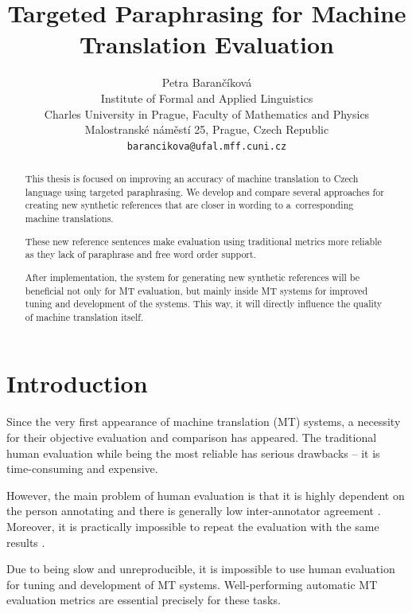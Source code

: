 \documentclass[11pt]{article}
\title{Targeted Paraphrasing for Machine Translation Evaluation}
\author{Petra Barančíková \\
  Institute of Formal and Applied Linguistics \\
  Charles University in Prague, Faculty of Mathematics and Physics\\
  Malostranské náměstí 25, Prague, Czech Republic \\
  {\tt barancikova@ufal.mff.cuni.cz} \\}
\date{}
\begin{document}
\maketitle
\begin{abstract}
This thesis is focused on improving an accuracy of machine translation to 
Czech language using targeted paraphrasing. We develop and compare several 
approaches for creating new synthetic references that are closer in wording to 
a~corresponding machine translations. 

These new reference sentences make evaluation using traditional metrics 
more reliable as they lack of paraphrase and free word order support.

After implementation, the system for generating new synthetic references will 
be beneficial not only for MT evaluation, but mainly inside MT systems for 
improved tuning and development of the systems. This way, it will directly 
influence the quality of machine translation itself.

\end{abstract}

\section{Introduction}
Since the very first appearance of machine translation (MT) systems, a 
necessity for their objective evaluation and comparison has appeared. The 
traditional human evaluation while being the most reliable has serious 
drawbacks -- it is time-consuming and expensive.

However, the main problem of human evaluation is that it is highly dependent on 
the person annotating and there is generally low inter-annotator agreement 
\cite{wmt13}. Moreover, it is practically impossible to repeat the evaluation 
with the same results \cite{bojar-kniha}.

Due to being slow and unreproducible, it is impossible to use human evaluation
for tuning and development of MT systems. Well-performing automatic MT 
evaluation metrics are essential precisely for these tasks.
\end{document}
